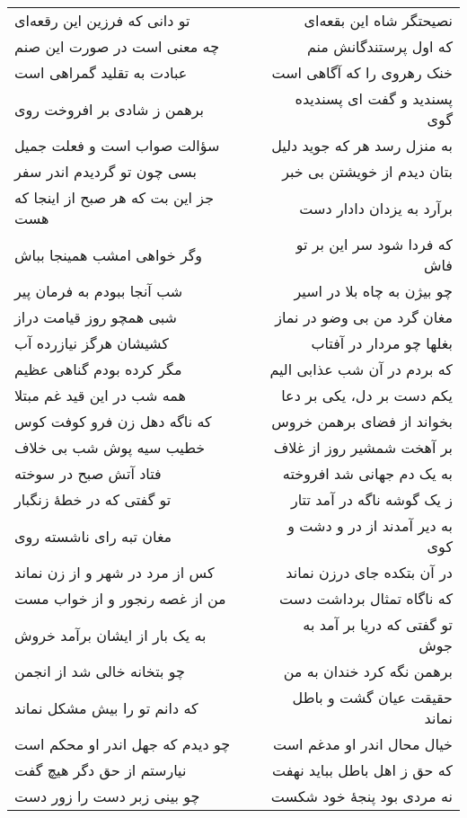 \begin{center}
\begin{longtable}{l p{0.5cm} r}
تو دانی که فرزین این رقعه‌ای
&&
نصیحتگر شاه این بقعه‌ای
\\
چه معنی است در صورت این صنم
&&
که اول پرستندگانش منم
\\
عبادت به تقلید گمراهی است
&&
خنک رهروی را که آگاهی است
\\
برهمن ز شادی بر افروخت روی
&&
پسندید و گفت ای پسندیده گوی
\\
سؤالت صواب است و فعلت جمیل
&&
به منزل رسد هر که جوید دلیل
\\
بسی چون تو گردیدم اندر سفر
&&
بتان دیدم از خویشتن بی خبر
\\
جز این بت که هر صبح از اینجا که هست
&&
برآرد به یزدان دادار دست
\\
وگر خواهی امشب همینجا بباش
&&
که فردا شود سر این بر تو فاش
\\
شب آنجا ببودم به فرمان پیر
&&
چو بیژن به چاه بلا در اسیر
\\
شبی همچو روز قیامت دراز
&&
مغان گرد من بی وضو در نماز
\\
کشیشان هرگز نیازرده آب
&&
بغلها چو مردار در آفتاب
\\
مگر کرده بودم گناهی عظیم
&&
که بردم در آن شب عذابی الیم
\\
همه شب در این قید غم مبتلا
&&
یکم دست بر دل، یکی بر دعا
\\
که ناگه دهل زن فرو کوفت کوس
&&
بخواند از فضای برهمن خروس
\\
خطیب سیه پوش شب بی خلاف
&&
بر آهخت شمشیر روز از غلاف
\\
فتاد آتش صبح در سوخته
&&
به یک دم جهانی شد افروخته
\\
تو گفتی که در خطهٔ زنگبار
&&
ز یک گوشه ناگه در آمد تتار
\\
مغان تبه رای ناشسته روی
&&
به دیر آمدند از در و دشت و کوی
\\
کس از مرد در شهر و از زن نماند
&&
در آن بتکده جای درزن نماند
\\
من از غصه رنجور و از خواب مست
&&
که ناگاه تمثال برداشت دست
\\
به یک بار از ایشان برآمد خروش
&&
تو گفتی که دریا بر آمد به جوش
\\
چو بتخانه خالی شد از انجمن
&&
برهمن نگه کرد خندان به من
\\
که دانم تو را بیش مشکل نماند
&&
حقیقت عیان گشت و باطل نماند
\\
چو دیدم که جهل اندر او محکم است
&&
خیال محال اندر او مدغم است
\\
نیارستم از حق دگر هیچ گفت
&&
که حق ز اهل باطل بباید نهفت
\\
چو بینی زبر دست را زور دست
&&
نه مردی بود پنجهٔ خود شکست
\\

\end{longtable}
\end{center}
